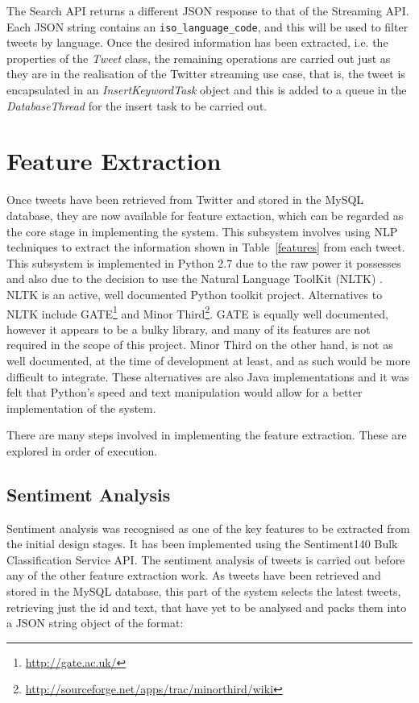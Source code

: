 The Search API returns a different JSON response to that of the Streaming API. Each JSON string contains an \texttt{iso\_language\_code}, and this will be used to filter tweets by language. Once the desired information has been extracted, i.e. the properties of the \emph{Tweet} class, the remaining operations are carried out just as they are in the realisation of the Twitter streaming use case, that is, the tweet is encapsulated in an \emph{InsertKeywordTask} object and this is added to a queue in the \emph{DatabaseThread} for the insert task to be carried out.



\python
\section{Feature Extraction}
\label{sec:fe}
Once tweets have been retrieved from Twitter and stored in the MySQL database, they are now available for feature extaction, which can be regarded as the core stage in implementing the system. This subsystem involves using NLP techniques to extract the information shown in Table~\ref{features} from each tweet. This subsystem is implemented in Python 2.7 due to the raw power it possesses and also due to the decision to use the Natural Language ToolKit (NLTK) \cite{NLTK}. NLTK is an active, well documented Python toolkit project. Alternatives to NLTK include GATE\footnote{\url{http://gate.ac.uk/}} and Minor Third\footnote{\url{http://sourceforge.net/apps/trac/minorthird/wiki}}. GATE is equally well documented, however it appears to be a bulky library, and many of its features are not required in the scope of this project. Minor Third on the other hand, is not as well documented, at the time of development at least, and as such would be more difficult to integrate. These alternatives are also Java implementations and it was felt that Python's speed and text manipulation would allow for a better implementation of the system.

There are many steps involved in implementing the feature extraction. These are explored in order of execution.

\subsection{Sentiment Analysis}
Sentiment analysis was recognised as one of the key features to be extracted from the initial design stages. It has been implemented using the Sentiment140 Bulk Classification Service API. 
The sentiment analysis of tweets is carried out before any of the other feature extraction work. As tweets have been retrieved and stored in the MySQL database, this part of the system selects the latest tweets, retrieving just the id and text, that have yet to be analysed and packs them into a JSON string object of the format:

